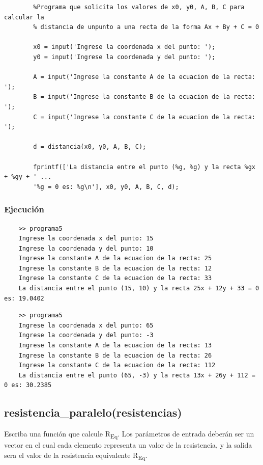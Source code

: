 \documentclass{article}
\begin{document}
	\begin{lstlisting}
		%Programa que solicita los valores de x0, y0, A, B, C para calcular la 
		% distancia de unpunto a una recta de la forma Ax + By + C = 0
		
		x0 = input('Ingrese la coordenada x del punto: ');
		y0 = input('Ingrese la coordenada y del punto: ');
		
		A = input('Ingrese la constante A de la ecuacion de la recta: ');
		B = input('Ingrese la constante B de la ecuacion de la recta: ');
		C = input('Ingrese la constante C de la ecuacion de la recta: ');
		
		d = distancia(x0, y0, A, B, C);
		
		fprintf(['La distancia entre el punto (%g, %g) y la recta %gx + %gy + ' ...
		'%g = 0 es: %g\n'], x0, y0, A, B, C, d);
	\end{lstlisting}
	
	\subsubsection{Ejecución}
	
	\begin{lstlisting}
	>> programa5
	Ingrese la coordenada x del punto: 15
	Ingrese la coordenada y del punto: 10
	Ingrese la constante A de la ecuacion de la recta: 25
	Ingrese la constante B de la ecuacion de la recta: 12
	Ingrese la constante C de la ecuacion de la recta: 33
	La distancia entre el punto (15, 10) y la recta 25x + 12y + 33 = 0 es: 19.0402
	\end{lstlisting}
	\begin{lstlisting}
	>> programa5
	Ingrese la coordenada x del punto: 65
	Ingrese la coordenada y del punto: -3
	Ingrese la constante A de la ecuacion de la recta: 13
	Ingrese la constante B de la ecuacion de la recta: 26
	Ingrese la constante C de la ecuacion de la recta: 112
	La distancia entre el punto (65, -3) y la recta 13x + 26y + 112 = 0 es: 30.2385
	\end{lstlisting}
	
	\newpage
	\subsection{resistencia\_paralelo(resistencias)}
	
	Escriba una función que calcule R\textsubscript{Eq}. Los parámetros de entrada deberán ser un vector en el cual cada elemento representa un valor de la resistencia, y la salida sera el valor de la resistencia equivalente R\textsubscript{Eq}.
	
\end{document}
